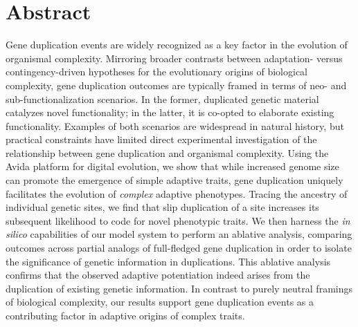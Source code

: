 \section*{Abstract}

Gene duplication events are widely recognized as a key factor in the evolution of organismal complexity.
Mirroring broader contrasts between adaptation- versus contingency-driven hypotheses for the evolutionary origins of biological complexity, gene duplication outcomes are typically framed in terms of neo- and sub-functionalization scenarios.
In the former, duplicated genetic material catalyzes novel functionality; in the latter, it is co-opted to elaborate existing functionality.
Examples of both scenarios are widespread in natural history, but practical constraints have limited direct experimental investigation of the relationship between gene duplication and organismal complexity.
Using the Avida platform for digital evolution, we show that while increased genome size can promote the emergence of simple adaptive traits, gene duplication uniquely facilitates the evolution of \textit{complex} adaptive phenotypes.
Tracing the ancestry of individual genetic sites, we find that slip duplication of a site increases its subsequent likelihood to code for novel phenotypic traits.
We then harness the \textit{in silico} capabilities of our model system to perform an ablative analysis, comparing outcomes across partial analogs of full-fledged gene duplication in order to isolate the significance of genetic information in duplications.
This ablative analysis confirms that the observed adaptive potentiation indeed arises from the duplication of existing genetic information.
In contrast to purely neutral framings of biological complexity, our results support gene duplication events as a contributing factor in adaptive origins of complex traits.
